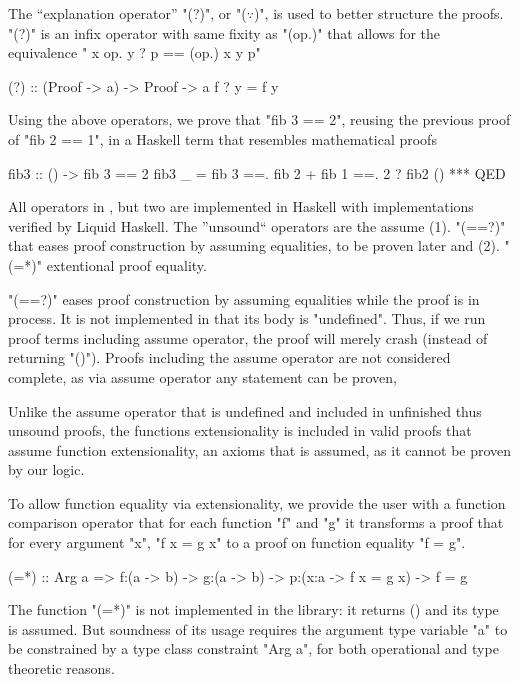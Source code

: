 %
The ``explanation operator'' "(?)", or "($\because$)",
is used to better structure the proofs.
%
"(?)" is an infix operator with same fixity as "(op.)"
that allows for the equivalence
%
" x op. y ? p == (op.) x y p"
%
\begin{code}
  (?) :: (Proof -> a) -> Proof -> a
  f ? y = f y
\end{code}

%
Using the above operators,
we prove that "fib 3 == 2",
reusing the previous proof of "fib 2 == 1",
in a Haskell term that resembles mathematical proofs
%
\begin{code}
  fib3 :: () ->  {fib 3 == 2}
  fib3 _
    =   fib 3
    ==. fib 2 + fib 1
    ==. 2             ? fib2 ()
    *** QED
\end{code}


All operators in \libname, but two are implemented in Haskell
with implementations verified by Liquid Haskell.
%
The ''unsound`` operators are the assume
(1). "(==?)" that eases proof construction by assuming equalities, to be proven later
and (2). "(=*)" extentional proof equality.

 "(==?)" eases proof construction by
assuming equalities while the proof is in process.
%
It is not implemented in that its body is "undefined".
%
Thus, if we run proof terms including assume operator, the proof will merely crash
(instead of returning "()").
%
Proofs including the assume operator are not considered complete,
as via assume operator any statement can be proven,

Unlike the assume operator that is undefined and
included in unfinished thus unsound proofs,
the functions extensionality is included in valid proofs
that assume function extensionality, an axioms that is assumed,
as it cannot be proven by our logic.

To allow function equality via extensionality,
we provide the user with a function comparison operator
that for each function "f" and "g" it transforms a proof
that for every argument "x", "f x = g x" to a proof
on function equality "f = g".
\begin{code}
(=*) :: Arg a => f:(a -> b) -> g:(a -> b)
     -> p:(x:a -> {f x = g x})
     -> {f = g}
\end{code}
%
The function "(=*)" is not implemented in the library:
it returns () and its type is assumed.
%
But soundness of its usage requires the argument type variable "a"
to be constrained by a type class constraint "Arg a",
for both operational and type theoretic reasons.
%

